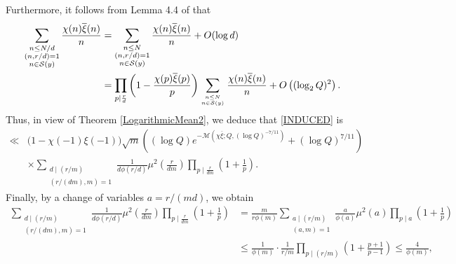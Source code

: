 \documentclass[12pt]{amsart}
\theoremstyle{definition}
\numberwithin{equation}{section}
\newcommand{\mc}{\mathcal}
\renewcommand{\bar}{\overline}
\begin{document}
Furthermore, it follows from Lemma 4.4 of \cite{GrSo2} that
\begin{align*}
\sum_{\substack{n \leq N/d\\ (n, r/d)=1\\ n \in \mc{S}(y)}} \frac{\chi(n)\bar{\xi}(n)}{n} &= \sum_{\substack{n \leq N\\ (n, r/d)=1\\ n \in \mc{S}(y)}} \frac{\chi(n)\bar{\xi}(n)}{n} +O(\log d)\\
&= \prod_{p \mid  \frac rd} \left(1-\frac{\chi(p)\bar{\xi}(p)}{p}\right) \sum_{n \leq N \atop n \in \mc{S}(y)} \frac{\chi(n)\bar{\xi}(n)}{n} + O\left((\log_2 Q)^2\right).
\end{align*}
Thus, in view of Theorem \ref{LogarithmicMean2}, we deduce that \eqref{INDUCED} is 
\begin{equation}\label{INDUCED2}
\begin{aligned} 
\ll &\Big(1-\chi(-1)\xi(-1)\Big)\sqrt{m}\left((\log Q)e^{-\mc{M}\left(\chi\bar{\xi};Q, (\log Q)^{-7/11}\right)}+(\log Q)^{7/11}\right)\\
& \times \sum_{\substack{d\mid (r/m)\\ (r/(dm), m)=1}} \frac{1}{d\phi(r/d)}  \mu^2\left(\frac{r}{dm}\right) \prod_{p \mid \frac{r}{dm}} \left(1+\frac{1}{p}\right).
\end{aligned}
\end{equation}
Finally, by a change of variables $a= r/(md)$, we obtain
\begin{align*}
\sum_{\substack{d\mid (r/m)\\ (r/(dm), m)=1}} \frac{1}{d\phi(r/d)}  \mu^2\left(\frac{r}{dm}\right) \prod_{p \mid  \frac{r}{dm}} \left(1+\frac{1}{p}\right)
&= \frac{m}{r\phi(m)}\sum_{\substack{a\mid (r/m)\\ (a, m)=1}} \frac{a}{\phi(a)}  \mu^2\left(a\right) \prod_{p \mid  a} \left(1+\frac{1}{p}\right)\\
&\leq \frac{1}{\phi(m)}\cdot \frac{1}{r/m} \prod_{p \mid (r/m)} \left(1+\frac{p+1}{p-1}\right)\leq \frac{4}{\phi(m)}, 
\end{align*}
\end{document}
